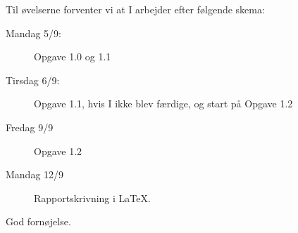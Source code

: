 \documentclass[a4paper,12pt]{article}
\begin{document}
Til øvelserne forventer vi at I arbejder efter følgende skema:
\begin{description}
\item[Mandag 5/9:] Opgave 1.0 og 1.1
\item[Tirsdag 6/9:] Opgave 1.1, hvis I ikke blev færdige, og start på Opgave 1.2
\item[Fredag 9/9]  Opgave 1.2
\item[Mandag 12/9] Rapportskrivning i LaTeX.
\end{description}

\flushright God fornøjelse.
\end{document}
